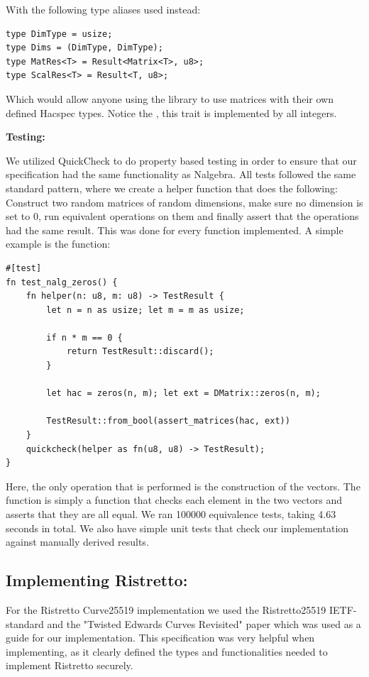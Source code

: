 \documentclass{article}
\newcommand*\ttvar[1]{\texttt{\expandafter\dottvar\detokenize{#1}\relax}}
\newcommand*\dottvar[1]{\ifx\relax#1\else
  \expandafter\ifx\string_#1\string_\allowbreak\else#1\fi
  \expandafter\dottvar\fi}
\begin{document}
With the following type aliases used instead:

\begin{lstlisting}
type DimType = usize;
type Dims = (DimType, DimType);
type MatRes<T> = Result<Matrix<T>, u8>;
type ScalRes<T> = Result<T, u8>;
\end{lstlisting}

Which would allow anyone using the library to use matrices with their
own defined Hacspec types. Notice the \ttvar{hacspec_lib::Integer},
this trait is implemented by all integers.

\textbf{Testing:}

We utilized QuickCheck to do property based testing in order to ensure
that our specification had the same functionality as Nalgebra. All tests 
followed the same standard pattern, where we create a helper function 
that does the following: Construct two random matrices of random 
dimensions, make sure no dimension is set to 0, run equivalent
operations on them and finally assert that the operations had the same
result. This was done for every function implemented. A simple example 
is the \ttvar{zeros} function:

\begin{lstlisting}
#[test]
fn test_nalg_zeros() {
	fn helper(n: u8, m: u8) -> TestResult {
		let n = n as usize; let m = m as usize;

		if n * m == 0 {
		    return TestResult::discard();
		}

		let hac = zeros(n, m); let ext = DMatrix::zeros(n, m);

		TestResult::from_bool(assert_matrices(hac, ext))
	}
	quickcheck(helper as fn(u8, u8) -> TestResult);
}
\end{lstlisting}

Here, the only operation that is performed is the construction of the
vectors. The \ttvar{assert_matrices} function is simply a function
that checks each element in the two vectors and asserts that they are 
all equal. We ran 100000 equivalence tests, taking 4.63 seconds in
total. We also have simple unit tests that check our implementation
against manually derived results.

\subsection{Implementing Ristretto:} \label{implementing-ristretto}

For the Ristretto Curve25519 implementation we used the Ristretto25519
IETF-standard \cite{ristretto-ietf} and the "Twisted Edwards Curves
Revisited" paper \cite{edwards-curves} which was used as a guide for our
implementation. This specification was very helpful when implementing,
as it clearly defined the types and functionalities needed to implement
Ristretto securely.
\end{document}
